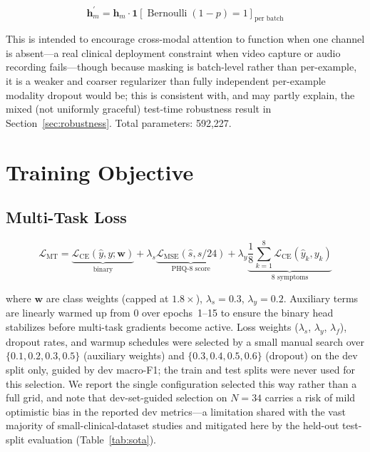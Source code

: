 \documentclass[journal]{IEEEtran}
\begin{document}
\begin{equation}
\mathbf{h}_m^\prime =
  \mathbf{h}_m \cdot \mathbf{1}[\operatorname{Bernoulli}(1-p)=1]_{\text{per batch}}
\label{eq:moddrop}
\end{equation}

This is intended to encourage cross-modal attention to function when
one channel is absent---a real clinical deployment constraint when
video capture or audio recording fails---though because masking is
batch-level rather than per-example, it is a weaker and coarser
regularizer than fully independent per-example modality dropout would
be; this is consistent with, and may partly explain, the mixed (not
uniformly graceful) test-time robustness result in
Section~\ref{sec:robustness}. Total parameters: 592,227.

\section{Training Objective}
\label{sec:training}

\subsection{Multi-Task Loss}

\begin{equation}
\mathcal{L}_\text{MT} =
  \underbrace{\mathcal{L}_\text{CE}(\hat{y},y;\mathbf{w})}_{\text{binary}}
  + \lambda_s\!\underbrace{\mathcal{L}_\text{MSE}(\hat{s},s/24)}_{\text{PHQ-8 score}}
  + \lambda_y\!\underbrace{\frac{1}{8}\sum_{k=1}^{8}
    \mathcal{L}_\text{CE}(\hat{y}_k,y_k)}_{\text{8 symptoms}}
\label{eq:mt_loss}
\end{equation}

where $\mathbf{w}$ are class weights (capped at $1.8\times$),
$\lambda_s=0.3$, $\lambda_y=0.2$. Auxiliary terms are linearly
warmed up from 0 over epochs~1--15 to ensure the binary head
stabilizes before multi-task gradients become active. Loss weights
($\lambda_s$, $\lambda_y$, $\lambda_f$), dropout rates, and warmup
schedules were selected by a small manual search over
$\{0.1,0.2,0.3,0.5\}$ (auxiliary weights) and
$\{0.3,0.4,0.5,0.6\}$ (dropout) on the dev split only, guided by
dev macro-F1; the train and test splits were never used for this
selection. We report the single configuration selected this way
rather than a full grid, and note that dev-set-guided selection
on $N{=}34$ carries a risk of mild optimistic bias in the reported
dev metrics---a limitation shared with the vast majority of
small-clinical-dataset studies and mitigated here by the
held-out test-split evaluation (Table~\ref{tab:sota}).
\end{document}
